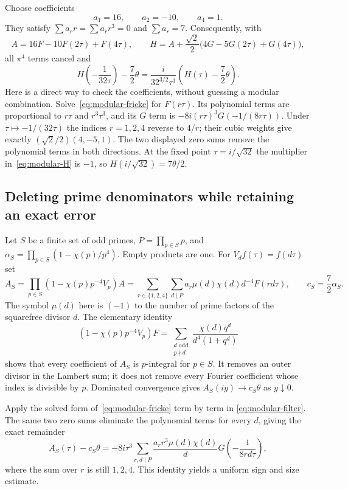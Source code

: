 Choose coefficients
\[
 a_1=16,\qquad a_2=-10,\qquad a_4=1.
\]
They satisfy $\sum a_rr=\sum a_rr^3=0$ and $\sum a_r=7$.
Consequently, with
\begin{equation}\label{eq:modular-AH}
 A=16F-10F(2\tau)+F(4\tau),\qquad
 H=A+\frac{\sqrt2}{2}\bigl(4G-5G(2\tau)+G(4\tau)\bigr),
\end{equation}
all $\pi^4$ terms cancel and
\begin{equation}\label{eq:modular-H}
 H\left(-\frac1{32\tau}\right)-\frac72\theta
  =\frac{i}{32^{3/2}\tau^3}\left(H(\tau)-\frac72\theta\right).
\end{equation}
Here is a direct way to check the coefficients, without guessing a
modular combination. Solve~\eqref{eq:modular-fricke} for $F(r\tau)$.
Its polynomial terms are proportional to $r\tau$ and $r^3\tau^3$,
and its $G$ term is
$-8i(r\tau)^3G(-1/(8r\tau))$. Under $\tau\mapsto-1/(32\tau)$
the indices $r=1,2,4$ reverse to $4/r$; their cubic weights give
exactly $(\sqrt2/2)(4,-5,1)$. The two displayed zero sums remove
the polynomial terms in both directions. At the fixed point
$\tau=i/\sqrt{32}$ the multiplier in~\eqref{eq:modular-H} is $-1$,
so $H(i/\sqrt{32})=7\theta/2$.

\subsection{Deleting prime denominators while retaining an exact error}
Let $S$ be a finite set of odd primes, $P=\prod_{p\in S}p$, and
$\alpha_S=\prod_{p\in S}(1-\chi(p)/p^4)$. Empty products are one.
For $V_df(\tau)=f(d\tau)$ set
\begin{equation}\label{eq:modular-filter}
 A_S=\prod_{p\in S}(1-\chi(p)p^{-4}V_p)A
    =\sum_{r\in\{1,2,4\}}\sum_{d\mid P}
           a_r\mu(d)\chi(d)d^{-4}F(rd\tau),\qquad
 c_S=\frac72\alpha_S.
\end{equation}
The symbol $\mu(d)$ here is $(-1)$ to the number of prime factors of
the squarefree divisor $d$. The elementary identity
\[
 (1-\chi(p)p^{-4}V_p)F
   =\sum_{\substack{d\text{ odd}\\p\nmid d}}
                  \frac{\chi(d)q^d}{d^4(1+q^d)}
\]
shows that every coefficient of $A_S$ is $p$-integral for $p\in S$.
It removes an outer divisor in the Lambert sum; it does not remove
every Fourier coefficient whose index is divisible by $p$.
Dominated convergence gives $A_S(iy)\to c_S\theta$ as $y\downarrow0$.

Apply the solved form of~\eqref{eq:modular-fricke} term by term in
\eqref{eq:modular-filter}. The same two zero sums eliminate the
polynomial terms for every $d$, giving the exact remainder
\begin{equation}\label{eq:modular-cusp-exact}
 A_S(\tau)-c_S\theta
   =-8i\tau^3\sum_{r,d\mid P}
          \frac{a_rr^3\mu(d)\chi(d)}{d}
                         G\left(-\frac1{8rd\tau}\right),
\end{equation}
where the sum over $r$ is still $1,2,4$.
This identity yields a uniform sign and size estimate.

